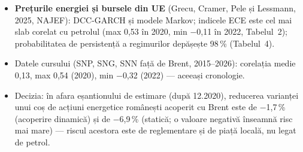 \begin{itemize}\setlength{\itemsep}{2pt}
  \item \textbf{Prețurile energiei și bursele din UE} (Grecu, Cramer, Pele și Lessmann, 2025, NAJEF): DCC-GARCH și modele Markov; indicele ECE este cel mai slab corelat cu petrolul (max 0,53 în 2020, min $-$0,11 în 2022, Tabelul~2); probabilitatea de persistență a regimurilor depășește 98\,\% (Tabelul~4).
  \item Datele cursului (SNP, SNG, SNN față de Brent, 2015--2026): corelația medie 0,13, max 0,54 (2020), min $-$0,32 (2022) --- aceeași cronologie.
  \item Decizia: în afara eșantionului de estimare (după 12.2020), reducerea varianței unui coș de acțiuni energetice românești acoperit cu Brent este de $-$1,7\,\% (acoperire dinamică) și de $-$6,9\,\% (statică; o valoare negativă înseamnă risc mai mare) --- riscul acestora este de reglementare și de piață locală, nu legat de petrol.
\end{itemize}

